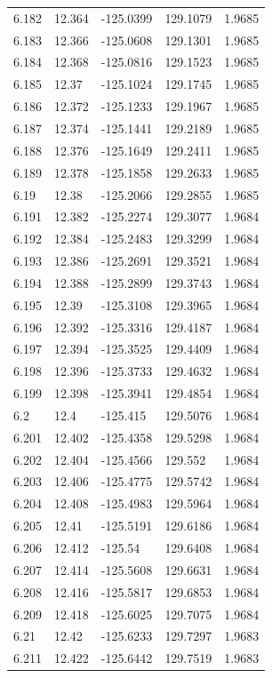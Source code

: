 \begin{tabular}{lllll}
6.182 & 12.364 & -125.0399 & 129.1079 & 1.9685 \\
6.183 & 12.366 & -125.0608 & 129.1301 & 1.9685 \\
6.184 & 12.368 & -125.0816 & 129.1523 & 1.9685 \\
6.185 & 12.37 & -125.1024 & 129.1745 & 1.9685 \\
6.186 & 12.372 & -125.1233 & 129.1967 & 1.9685 \\
6.187 & 12.374 & -125.1441 & 129.2189 & 1.9685 \\
6.188 & 12.376 & -125.1649 & 129.2411 & 1.9685 \\
6.189 & 12.378 & -125.1858 & 129.2633 & 1.9685 \\
6.19 & 12.38 & -125.2066 & 129.2855 & 1.9685 \\
6.191 & 12.382 & -125.2274 & 129.3077 & 1.9684 \\
6.192 & 12.384 & -125.2483 & 129.3299 & 1.9684 \\
6.193 & 12.386 & -125.2691 & 129.3521 & 1.9684 \\
6.194 & 12.388 & -125.2899 & 129.3743 & 1.9684 \\
6.195 & 12.39 & -125.3108 & 129.3965 & 1.9684 \\
6.196 & 12.392 & -125.3316 & 129.4187 & 1.9684 \\
6.197 & 12.394 & -125.3525 & 129.4409 & 1.9684 \\
6.198 & 12.396 & -125.3733 & 129.4632 & 1.9684 \\
6.199 & 12.398 & -125.3941 & 129.4854 & 1.9684 \\
6.2 & 12.4 & -125.415 & 129.5076 & 1.9684 \\
6.201 & 12.402 & -125.4358 & 129.5298 & 1.9684 \\
6.202 & 12.404 & -125.4566 & 129.552 & 1.9684 \\
6.203 & 12.406 & -125.4775 & 129.5742 & 1.9684 \\
6.204 & 12.408 & -125.4983 & 129.5964 & 1.9684 \\
6.205 & 12.41 & -125.5191 & 129.6186 & 1.9684 \\
6.206 & 12.412 & -125.54 & 129.6408 & 1.9684 \\
6.207 & 12.414 & -125.5608 & 129.6631 & 1.9684 \\
6.208 & 12.416 & -125.5817 & 129.6853 & 1.9684 \\
6.209 & 12.418 & -125.6025 & 129.7075 & 1.9684 \\
6.21 & 12.42 & -125.6233 & 129.7297 & 1.9683 \\
6.211 & 12.422 & -125.6442 & 129.7519 & 1.9683 \\

\end{tabular}
